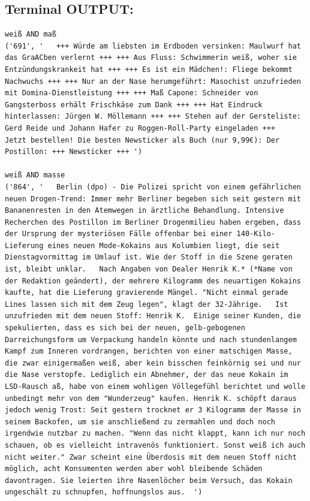 \documentclass[a4paper]{scrartcl}
\begin{document}
\subsection*{Terminal OUTPUT:}
\begin{lstlisting}
weiß AND maß
('691', '   +++ Würde am liebsten im Erdboden versinken: Maulwurf hat das GraACben verlernt +++ +++ Aus Fluss: Schwimmerin weiß, woher sie Entzündungskrankeit hat +++ +++ Es ist ein Mädchen!: Fliege bekommt Nachwuchs +++ +++ Nur an der Nase herumgeführt: Masochist unzufrieden mit Domina-Dienstleistung +++ +++ Maß Capone: Schneider von Gangsterboss erhält Frischkäse zum Dank +++ +++ Hat Eindruck hinterlassen: Jürgen W. Möllemann +++ +++ Stehen auf der Gersteliste: Gerd Reide und Johann Hafer zu Roggen-Roll-Party eingeladen +++   Jetzt bestellen! Die besten Newsticker als Buch (nur 9,99€): Der Postillon: +++ Newsticker +++ ')

weiß AND masse
('864', '   Berlin (dpo) - Die Polizei spricht von einem gefährlichen neuen Drogen-Trend: Immer mehr Berliner begeben sich seit gestern mit Bananenresten in den Atemwegen in ärztliche Behandlung. Intensive Recherchen des Postillon im Berliner Drogenmilieu haben ergeben, dass der Ursprung der mysteriösen Fälle offenbar bei einer 140-Kilo-Lieferung eines neuen Mode-Kokains aus Kolumbien liegt, die seit Dienstagvormittag im Umlauf ist. Wie der Stoff in die Szene geraten ist, bleibt unklar.   Nach Angaben von Dealer Henrik K.* (*Name von der Redaktion geändert), der mehrere Kilogramm des neuartigen Kokains kaufte, hat die Lieferung gravierende Mängel. "Nicht einmal gerade Lines lassen sich mit dem Zeug legen", klagt der 32-Jährige.   Ist unzufrieden mit dem neuen Stoff: Henrik K.  Einige seiner Kunden, die spekulierten, dass es sich bei der neuen, gelb-gebogenen Darreichungsform um Verpackung handeln könnte und nach stundenlangem Kampf zum Inneren vordrangen, berichten von einer matschigen Masse, die zwar einigermaßen weiß, aber kein bisschen feinkörnig sei und nur die Nase verstopfe. Lediglich ein Abnehmer, der das neue Kokain im LSD-Rausch aß, habe von einem wohligen Völlegefühl berichtet und wolle unbedingt mehr von dem "Wunderzeug" kaufen. Henrik K. schöpft daraus jedoch wenig Trost: Seit gestern trocknet er 3 Kilogramm der Masse in seinem Backofen, um sie anschließend zu zermahlen und doch noch irgendwie nutzbar zu machen. "Wenn das nicht klappt, kann ich nur noch schauen, ob es vielleicht intravenös funktioniert. Sonst weiß ich auch nicht weiter." Zwar scheint eine Überdosis mit dem neuen Stoff nicht möglich, acht Konsumenten werden aber wohl bleibende Schäden davontragen. Sie leierten ihre Nasenlöcher beim Versuch, das Kokain ungeschält zu schnupfen, hoffnungslos aus.  ') 


\end{lstlisting}
\end{document}
